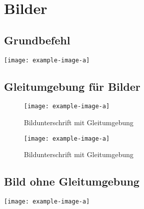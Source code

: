 %
\chapter{Bilder}

    \section{Grundbefehl}
        \texttt{[image: example-image-a]}

    \section{Gleitumgebung für Bilder}
        \begin{figure}[htb]                                    %
            \centering                                        %
            \texttt{[image: example-image-a]}
            \caption{Bildunterschrift mit Gleitumgebung}    %
            \label{fig:figure}                                %
        \end{figure}

        \begin{figure}[htb]
            \centering
            \texttt{[image: example-image-a]}
            \caption{Bildunterschrift mit Gleitumgebung}
            \label{fig:figure2}
        \end{figure}

        \clearpage                                            %

    \section{Bild ohne Gleitumgebung}
        \texttt{[image: example-image-a]}
